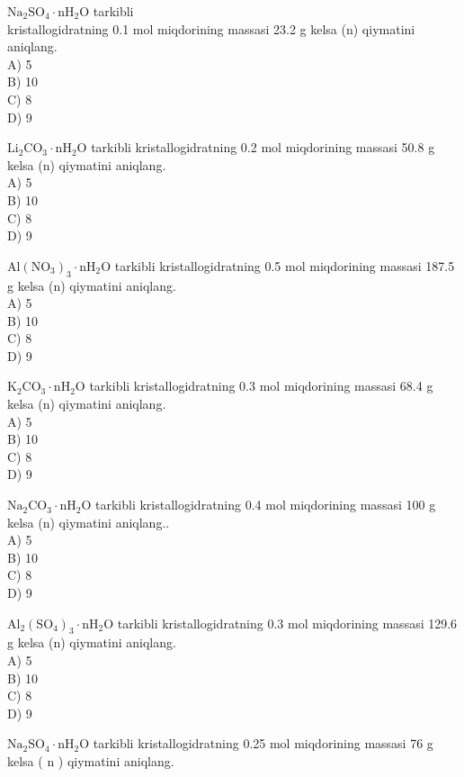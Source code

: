   \item $\mathrm{Na}_{2} \mathrm{SO}_{4} \cdot \mathrm{nH}_{2} \mathrm{O}$ tarkibli\\
kristallogidratning 0.1 mol miqdorining massasi 23.2 g kelsa (n) qiymatini aniqlang.\\
A) 5\\
B) 10\\
C) 8\\
D) 9
  \item $\mathrm{Li}_{2} \mathrm{CO}_{3} \cdot \mathrm{nH}_{2} \mathrm{O}$ tarkibli kristallogidratning 0.2 mol miqdorining massasi 50.8 g kelsa (n) qiymatini aniqlang.\\
A) 5\\
B) 10\\
C) 8\\
D) 9
  \item $\mathrm{Al}\left(\mathrm{NO}_{3}\right)_{3} \cdot \mathrm{nH}_{2} \mathrm{O}$ tarkibli kristallogidratning 0.5 mol miqdorining massasi 187.5 g kelsa (n) qiymatini aniqlang.\\
A) 5\\
B) 10\\
C) 8\\
D) 9
  \item $\mathrm{K}_{2} \mathrm{CO}_{3} \cdot \mathrm{nH}_{2} \mathrm{O}$ tarkibli kristallogidratning 0.3 mol miqdorining massasi 68.4 g kelsa (n) qiymatini aniqlang.\\
A) 5\\
B) 10\\
C) 8\\
D) 9
  \item $\mathrm{Na}_{2} \mathrm{CO}_{3} \cdot \mathrm{nH}_{2} \mathrm{O}$ tarkibli kristallogidratning 0.4 mol miqdorining massasi 100 g kelsa (n) qiymatini aniqlang..\\
A) 5\\
B) 10\\
C) 8\\
D) 9
  \item $\mathrm{Al}_{2}\left(\mathrm{SO}_{4}\right)_{3} \cdot \mathrm{nH}_{2} \mathrm{O}$ tarkibli kristallogidratning 0.3 mol miqdorining massasi 129.6 g kelsa (n) qiymatini aniqlang.\\
A) 5\\
B) 10\\
C) 8\\
D) 9
  \item $\mathrm{Na}_{2} \mathrm{SO}_{4} \cdot \mathrm{nH}_{2} \mathrm{O}$ tarkibli kristallogidratning 0.25 mol miqdorining massasi 76 g kelsa ( n ) qiymatini aniqlang.\\
